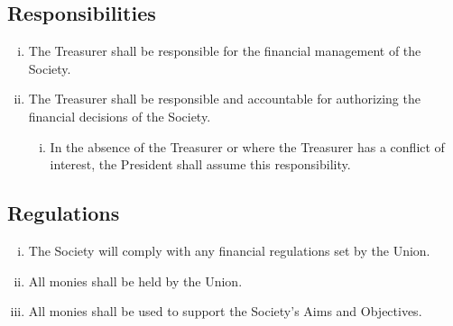 \subsection{Responsibilities}
\begin{enumerate}[i.]
    \item The Treasurer shall be responsible for the financial management of the Society.
    \item The Treasurer shall be responsible and accountable for authorizing the financial decisions of the Society.
    \begin{enumerate}[i.]
        \item In the absence of the Treasurer or where the Treasurer has a conflict of interest, the President shall assume this responsibility.
    \end{enumerate}
\end{enumerate}

\subsection{Regulations}
\begin{enumerate}[i.]
    \item The Society will comply with any financial regulations set by the Union.
    \item All monies shall be held by the Union.
    \item All monies shall be used to support the Society’s Aims and Objectives.
\end{enumerate}